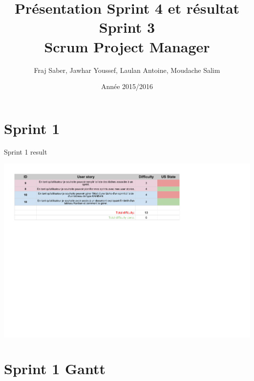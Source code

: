 \documentclass{beamer}
\title{}
\title{Présentation Sprint 4 et résultat Sprint 3 \\ Scrum Project Manager}
\author{Fraj Saber, Jawhar Youssef, Laulan Antoine, Moudache Salim}
\institute{Université de Bordeaux}
\date{Année 2015/2016}
\begin{document}


\begin{frame}
    \titlepage
\end{frame}



\section{Sprint 1}

\begin{frame}{Sprint 1 result}
	\begin{center}
        \includegraphics[scale=0.55]{Sprint3.pdf}
        \end{center}
\end{frame}


\section{Sprint 1 Gantt }
\end{document}
